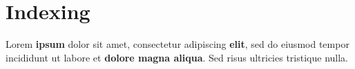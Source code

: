 \documentclass[a4paper, 12pt]{report}
\begin{document}
\chapter{Indexing}
Lorem \textbf{ipsum} dolor sit amet, consectetur adipiscing \textbf{elit}, sed do eiusmod tempor incididunt ut labore et \textbf{dolore magna aliqua}. Sed risus ultricies tristique nulla.






\printindex
\end{document}
